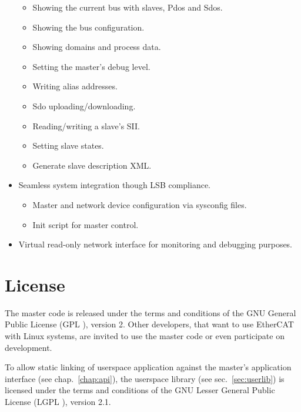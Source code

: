 \documentclass[a4paper,12pt,BCOR6mm,bibtotoc,idxtotoc]{scrbook}
\begin{document}
\begin{itemize}
\begin{itemize}
  \item Showing the current bus with slaves, Pdos and Sdos.
  \item Showing the bus configuration.
  \item Showing domains and process data.
  \item Setting the master's debug level.
  \item Writing alias addresses.
  \item Sdo uploading/downloading.
  \item Reading/writing a slave's SII.
  \item Setting slave states.
  \item Generate slave description XML.

  \end{itemize}

\item Seamless system integration though LSB compliance.

  \begin{itemize}

  \item Master and network device configuration via sysconfig files.

  \item Init script for master control.

  \end{itemize}

\item Virtual read-only network interface for monitoring and debugging
  purposes.

\end{itemize}


\section{License}
\label{sec:license}

The master code is released under the terms and conditions of the GNU General
Public License (GPL \cite{gpl}), version 2. Other developers, that
want to use EtherCAT with Linux systems, are invited to use the master code or
even participate on development.

To allow static linking of userspace application against the master's
application interface (see chap.~\ref{chap:api}), the userspace library (see
sec.~\ref{sec:userlib}) is licensed under the terms and conditions of the GNU
Lesser General Public License (LGPL \cite{lgpl}), version 2.1.
\end{document}
